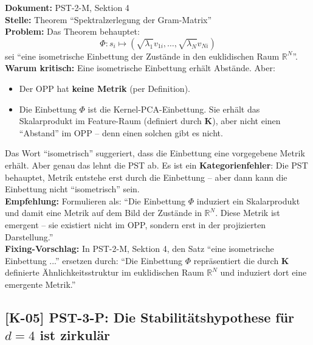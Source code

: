 \documentclass[11pt,a4paper]{article}
\newcommand{\K}[1]{\textbf{[K-#1]}}
\newcommand{\Dok}[1]{\textbf{Dokument:} #1\\}
\newcommand{\Stelle}[1]{\textbf{Stelle:} #1\\}
\newcommand{\Prob}[1]{\textbf{Problem:} #1\\}
\newcommand{\Krit}[1]{\textbf{Warum kritisch:} #1\\}
\newcommand{\Empf}[1]{\textbf{Empfehlung:} #1\\}
\newcommand{\Fix}[1]{\textbf{Fixing-Vorschlag:} #1\\}
\begin{document}
\Dok{PST-2-M, Sektion 4}
\Stelle{Theorem ``Spektralzerlegung der Gram-Matrix''}
\Prob{Das Theorem behauptet:
\[
  \Phi: s_i \mapsto (\sqrt{\lambda_1} v_{1i}, \ldots, \sqrt{\lambda_N} v_{Ni})
\]
sei ``eine isometrische Einbettung der Zust\"{a}nde in den euklidischen
Raum $\mathbb{R}^N$''.}
\Krit{Eine isometrische Einbettung erh\"{a}lt Abst\"{a}nde. Aber:
\begin{itemize}
  \item Der OPP hat \textbf{keine Metrik} (per Definition).
  \item Die Einbettung $\Phi$ ist die Kernel-PCA-Einbettung. Sie erh\"{a}lt
    das Skalarprodukt im Feature-Raum (definiert durch $\mathbf{K}$),
    aber nicht einen ``Abstand'' im OPP -- denn einen solchen gibt es
    nicht.
\end{itemize}
Das Wort ``isometrisch'' suggeriert, dass die Einbettung eine
vorgegebene Metrik erh\"{a}lt. Aber genau das lehnt die PST ab. Es ist
ein \textbf{Kategorienfehler}: Die PST behauptet, Metrik entstehe erst
durch die Einbettung -- aber dann kann die Einbettung nicht
``isometrisch'' sein.}
\Empf{Formulieren als: ``Die Einbettung $\Phi$ induziert ein
Skalarprodukt und damit eine Metrik auf dem Bild der Zust\"{a}nde in
$\mathbb{R}^N$. Diese Metrik ist emergent -- sie existiert nicht im
OPP, sondern erst in der projizierten Darstellung.''}
\Fix{In PST-2-M, Sektion 4, den Satz ``eine isometrische Einbettung
...'' ersetzen durch: ``Die Einbettung $\Phi$ repr\"{a}sentiert die
durch $\mathbf{K}$ definierte \"{A}hnlichkeitsstruktur im euklidischen
Raum $\mathbb{R}^N$ und induziert dort eine emergente Metrik.''}

\subsection{\K{05} PST-3-P: Die Stabilit\"{a}tshypothese f\"{u}r $d = 4$ ist zirkul\"{a}r}
\end{document}
